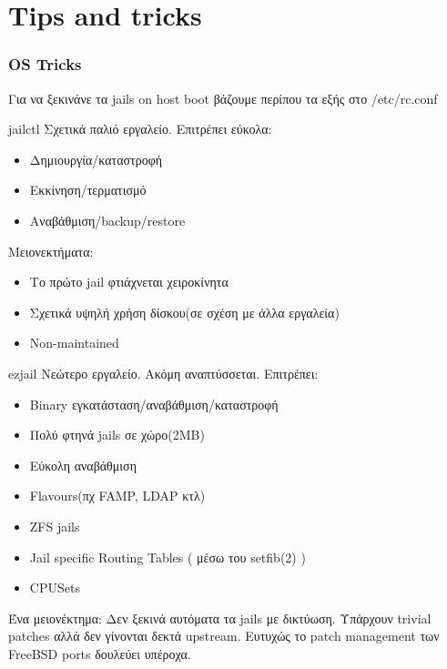 \documentclass{beamer}
\begin{document}
\section{Tips and tricks}
    \begin{frame}
            \frametitle{OS Tricks}
        Για να ξεκινάνε τα jails on host boot βάζουμε περίπου τα εξής στο /etc/rc.conf
        
    \end{frame}

    \begin{frame}{jailctl}
        Σχετικά παλιό εργαλείο. Επιτρέπει εύκολα:
        \begin{itemize}
            \item Δημιουργία/καταστροφή
            \item Εκκίνηση/τερματισμό
            \item Αναβάθμιση/backup/restore
        \end{itemize}
        Μειονεκτήματα:
        \begin{itemize}
            \item Το πρώτο jail φτιάχνεται χειροκίνητα
            \item Σχετικά υψηλή χρήση δίσκου(σε σχέση με άλλα εργαλεία)
            \item Non-maintained
        \end{itemize}
    \end{frame}

    \begin{frame}{ezjail}
        Νεώτερο εργαλείο. Ακόμη αναπτύσσεται. Επιτρέπει:
        \begin{itemize}
            \item Binary εγκατάσταση/αναβάθμιση/καταστροφή
            \item Πολύ φτηνά jails σε χώρο(2ΜΒ)
            \item Εύκολη αναβάθμιση
            \item Flavours(πχ FAMP, LDAP κτλ)
            \item ZFS jails
            \item Jail specific Routing Tables ( μέσω του setfib(2) )
            \item CPUSets
        \end{itemize}
        Ένα μειονέκτημα: Δεν ξεκινά αυτόματα τα jails με δικτύωση. Υπάρχουν trivial patches αλλά δεν γίνονται δεκτά upstream. Ευτυχώς το patch management των FreeBSD ports δουλεύει υπέροχα.
    \end{frame}
\end{document}
